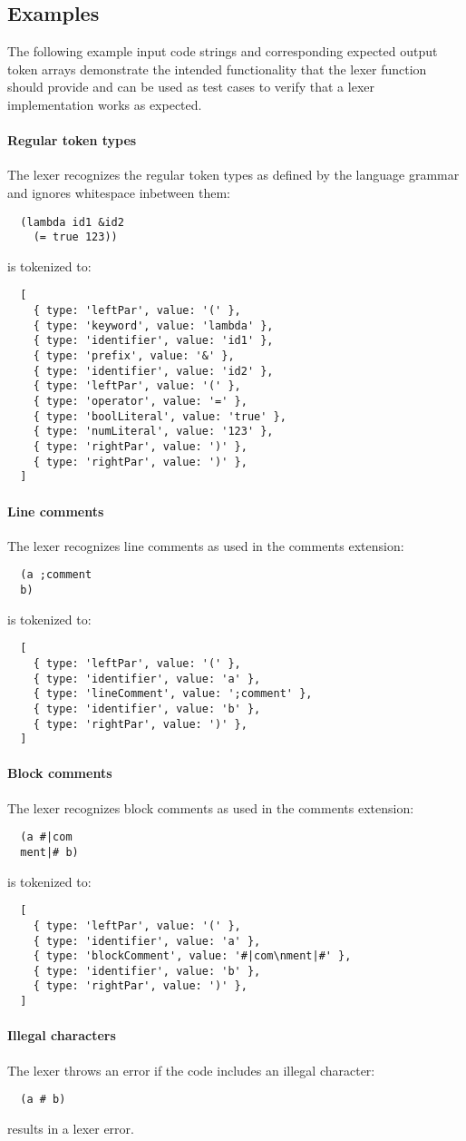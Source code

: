 \subsection{Examples}
The following example input code strings and corresponding expected output token arrays
demonstrate the intended functionality that the lexer function should provide
and can be used as test cases to verify that a lexer implementation works as expected.

\paragraph{Regular token types}
The lexer recognizes the regular token types
as defined by the language grammar
and ignores whitespace inbetween them:
\begin{verbatim}
  (lambda id1 &id2
    (= true 123))
\end{verbatim}
is tokenized to:
\begin{verbatim}
  [
    { type: 'leftPar', value: '(' },
    { type: 'keyword', value: 'lambda' },
    { type: 'identifier', value: 'id1' },
    { type: 'prefix', value: '&' },
    { type: 'identifier', value: 'id2' },
    { type: 'leftPar', value: '(' },
    { type: 'operator', value: '=' },
    { type: 'boolLiteral', value: 'true' },
    { type: 'numLiteral', value: '123' },
    { type: 'rightPar', value: ')' },
    { type: 'rightPar', value: ')' },
  ]
\end{verbatim}

\paragraph{Line comments}
The lexer recognizes line comments
as used in the comments extension:
\begin{verbatim}
  (a ;comment
  b)
\end{verbatim}
is tokenized to:
\begin{verbatim}
  [
    { type: 'leftPar', value: '(' },
    { type: 'identifier', value: 'a' },
    { type: 'lineComment', value: ';comment' },
    { type: 'identifier', value: 'b' },
    { type: 'rightPar', value: ')' },
  ]
\end{verbatim}

\paragraph{Block comments}
The lexer recognizes block comments
as used in the comments extension:
\begin{verbatim}
  (a #|com
  ment|# b)
\end{verbatim}
is tokenized to:
\begin{verbatim}
  [
    { type: 'leftPar', value: '(' },
    { type: 'identifier', value: 'a' },
    { type: 'blockComment', value: '#|com\nment|#' },
    { type: 'identifier', value: 'b' },
    { type: 'rightPar', value: ')' },
  ]
\end{verbatim}

\paragraph{Illegal characters}
The lexer throws an error
if the code includes an illegal character:
\begin{verbatim}
  (a # b)
\end{verbatim}
results in a lexer error.

